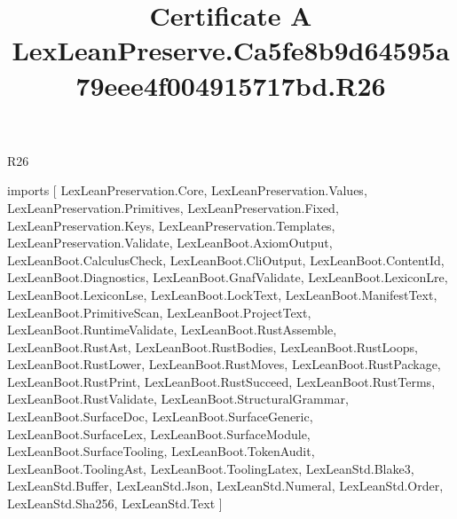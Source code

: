 \begin{lexlean}{R26}
\title{Certificate A LexLeanPreserve.Ca5fe8b9d64595a79eee4f004915717bd.R26}
\begin{coremodule}
imports [
  LexLeanPreservation.Core,
  LexLeanPreservation.Values,
  LexLeanPreservation.Primitives,
  LexLeanPreservation.Fixed,
  LexLeanPreservation.Keys,
  LexLeanPreservation.Templates,
  LexLeanPreservation.Validate,
  LexLeanBoot.AxiomOutput,
  LexLeanBoot.CalculusCheck,
  LexLeanBoot.CliOutput,
  LexLeanBoot.ContentId,
  LexLeanBoot.Diagnostics,
  LexLeanBoot.GnafValidate,
  LexLeanBoot.LexiconLre,
  LexLeanBoot.LexiconLse,
  LexLeanBoot.LockText,
  LexLeanBoot.ManifestText,
  LexLeanBoot.PrimitiveScan,
  LexLeanBoot.ProjectText,
  LexLeanBoot.RuntimeValidate,
  LexLeanBoot.RustAssemble,
  LexLeanBoot.RustAst,
  LexLeanBoot.RustBodies,
  LexLeanBoot.RustLoops,
  LexLeanBoot.RustLower,
  LexLeanBoot.RustMoves,
  LexLeanBoot.RustPackage,
  LexLeanBoot.RustPrint,
  LexLeanBoot.RustSucceed,
  LexLeanBoot.RustTerms,
  LexLeanBoot.RustValidate,
  LexLeanBoot.StructuralGrammar,
  LexLeanBoot.SurfaceDoc,
  LexLeanBoot.SurfaceGeneric,
  LexLeanBoot.SurfaceLex,
  LexLeanBoot.SurfaceModule,
  LexLeanBoot.SurfaceTooling,
  LexLeanBoot.TokenAudit,
  LexLeanBoot.ToolingAst,
  LexLeanBoot.ToolingLatex,
  LexLeanStd.Blake3,
  LexLeanStd.Buffer,
  LexLeanStd.Json,
  LexLeanStd.Numeral,
  LexLeanStd.Order,
  LexLeanStd.Sha256,
  LexLeanStd.Text
]


\end{coremodule}
\end{lexlean}
